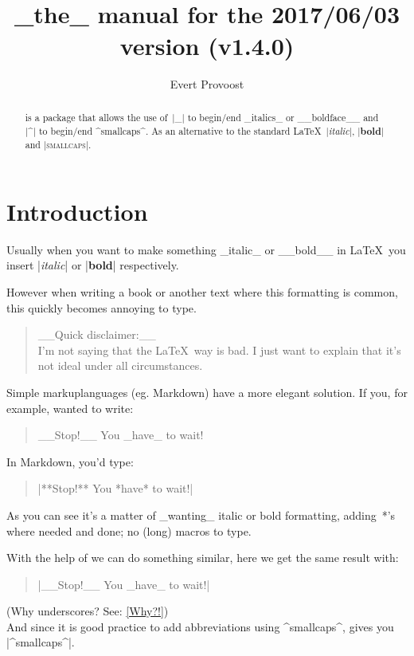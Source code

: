 \documentclass[11pt, cm-default]{l3doc}
\title{\pkg{easyformat}\\[.5em]
		\large _the_ manual for the 2017/06/03 version (v1.4.0)}
\author{Evert Provoost}
\date{}
\begin{document}
	\maketitle
	
	\begin{abstract}
		 is a package that allows the use of~|_| to begin/end _italics_ or __boldface__ and |^| to begin/end ^smallcaps^. As an alternative to the standard \LaTeX\ |\textit{italic}|, |\textbf{bold}| and |\textsc{smallcaps}|.
	\end{abstract}

	\tableofcontents


	\section{Introduction}
	Usually when you want to make something _italic_ or __bold__ in \LaTeX\ you insert |\textit{italic}| or |\textbf{bold}| respectively.
	
	However when writing a book or another text where this formatting is common, this quickly becomes annoying to type.

	\begin{quote}
	__Quick disclaimer:__\\
	I'm not saying that the \LaTeX\ way is bad. I just want to explain that it's not ideal under all circumstances.
	\end{quote}
	
	Simple markuplanguages (eg. Markdown) have a more elegant solution.	
	If you, for example, wanted to write:
	\begin{quote}
		__Stop!__ You _have_ to wait!
	\end{quote}

	In Markdown, you'd type:
	\begin{quote}
		|**Stop!** You *have* to wait!|
	\end{quote}

	As you can see it's a matter of _wanting_ italic or bold formatting, adding~*'s where needed and done; no (long) macros to type.
	
	With the help of  we can do something similar, here we get the same result with:
	\begin{quote}
		|__Stop!__ You _have_ to wait!|
	\end{quote}
	
	(Why underscores? See: \ref{Why?!})\\
	
	And since it is good practice to add abbreviations using ^smallcaps^,  gives you |^smallcaps^|.
	
\end{document}
